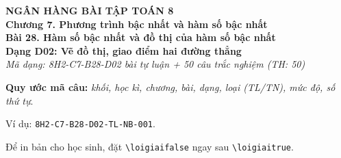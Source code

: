 \documentclass[12pt,a4paper]{article}
\newif\ifloigiai
\begin{document}
\begin{center}
{\Large\textbf{NGÂN HÀNG BÀI TẬP TOÁN 8}}\\[3pt]
\textbf{Chương 7. Phương trình bậc nhất và hàm số bậc nhất}\\[2pt]
\textbf{Bài 28. Hàm số bậc nhất và đồ thị của hàm số bậc nhất}\\[2pt]
\textbf{Dạng D02: Vẽ đồ thị, giao điểm hai đường thẳng}\\[2pt]
\textit{Mã dạng: 8H2-C7-B28-D02  bài tự luận + 50 câu trắc nghiệm \quad (TH: 50)}
\end{center}
\textbf{Quy ước mã câu:} \textit{khối, học kì, chương, bài, dạng, loại (TL/TN), mức độ, số thứ tự}.\par Ví dụ: \texttt{8H2-C7-B28-D02-TL-NB-001}.\par Để in bản cho học sinh, đặt \verb|\loigiaifalse| ngay sau \verb|\loigiaitrue|.
\end{document}
